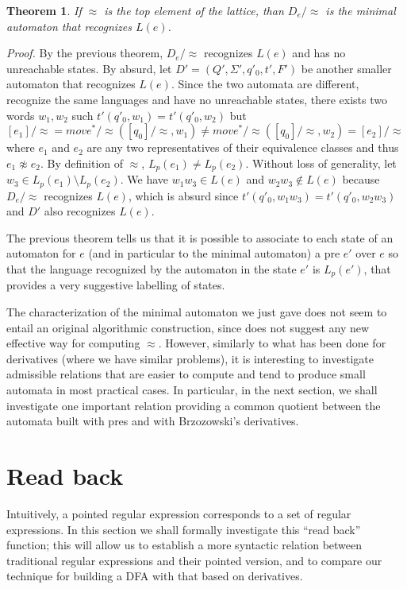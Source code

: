 \documentclass[preprint]{sigplanconf}
\newcounter{item}
\newtheorem{theorem}[item]{Theorem}
\newenvironment{proof}{\begin{trivlist}\item[]{\em Proof.}}{\end{trivlist}}
\begin{document}
\begin{theorem}
If $\approx$ is the top element of the lattice, than $D_e/{\approx}$ is the
minimal automaton that recognizes $L(e)$.
\end{theorem}
\begin{proof}
By the previous theorem, $D_e/{\approx}$ recognizes $L(e)$ and has no
unreachable states. By absurd, let
$D' = (Q',\Sigma',q'_0,t',F')$ be another smaller automaton that recognizes
$L(e)$. Since the two automata are different, recognize the same languages and
have no unreachable states, there exists two words $w_1,w_2$ such
$t'(q'_0,w_1) = t'(q'_0,w_2)$ but
$[e_1]/{\approx} = move^*/{\approx}([q_0]/{\approx},w_1) \neq
 move^*/{\approx}([q_0]/{\approx},w_2) = [e_2]/{\approx}$ where $e_1$ and $e_2$
are any two representatives of their equivalence classes and thus $e_1 \not \approx e_2$. By definition of $\approx$, $L_p(e_1) \neq L_p(e_2)$. Without loss
of generality, let $w_3 \in L_p(e_1) \setminus L_p(e_2)$. We have
$w_1 w_3 \in L(e)$ and $w_2 w_3 \not \in L(e)$ because $D_e/{\approx}$ recognizes $L(e)$, which is absurd since
$t'(q'_0,w_1 w_3) = t'(q'_0,w_2 w_3)$ and $D'$ also recognizes $L(e)$.
\end{proof}

The previous theorem tells us that it is possible to associate to each state
of an automaton for $e$ (and in particular to the minimal automaton) 
a pre $e'$ over $e$ so that the language recognized by the automaton 
in the state $e'$ is $L_p(e')$, that provides a very suggestive labelling
of states. 



The characterization of the minimal automaton we just gave does not
seem to entail an original algorithmic construction, since does
not suggest any new effective way for computing $\approx$. However,
similarly to what has been done for derivatives (where we have similar
problems), it is interesting to investigate
admissible relations that are easier to compute and tend 
to produce small automata in most practical cases. 
In particular, in the next section, we shall investigate one important
relation providing a common quotient between the automata built
with pres and with Brzozowski's derivatives.

\section{Read back}
Intuitively, a pointed regular expression corresponds to a set
of regular expressions. In this section we shall formally investigate
this ``read back'' function; this will allow us to establish a more
syntactic relation between traditional regular expressions 
and their pointed version, and to compare our technique for building 
a DFA with that based on derivatives.
\end{document}
